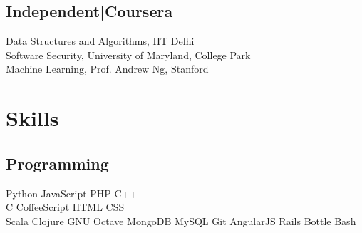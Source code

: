 \documentclass[]{deedy-resume-openfont}
\begin{document}
\begin{minipage}[t]{0.33\textwidth}
\subsection{Independent|Coursera}
Data Structures and Algorithms, IIT Delhi\\
Software Security, University of Maryland, College Park\\
Machine Learning, Prof. Andrew Ng, Stanford
\sectionsep


\section{Skills}
\subsection{Programming}
Python \textbullet{} JavaScript \textbullet{} PHP \textbullet{} C++ \\
C \textbullet{} CoffeeScript \textbullet{} HTML \textbullet{}  CSS \\
Scala \textbullet{} Clojure \textbullet{} GNU Octave \textbullet{} MongoDB \textbullet{} MySQL \textbullet{} Git \textbullet{} AngularJS \textbullet{} Rails \textbullet{} Bottle \textbullet{} Bash
\sectionsep

%
%

\end{minipage} 
\hfill
\end{document}
